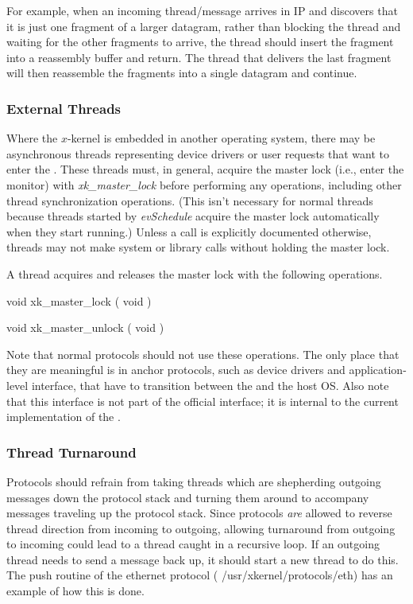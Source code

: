 For example, when an incoming thread/message arrives in IP and
discovers that it is just one fragment of a larger datagram, rather
than blocking the thread and waiting for the other fragments to arrive,
the thread should insert the fragment into a reassembly buffer and
return. The thread that delivers the last fragment will then
reassemble the fragments into a single datagram and continue.

\subsubsection{External Threads}
\label{ext-threads}

Where the $x$-kernel is embedded in another operating system, there
may be asynchronous threads representing device drivers or user
requests that want to enter the \xk{}.  These threads must, in
general, acquire the \xk{} master lock (i.e., enter the \xk{} monitor)
with {\em xk\_master\_lock} before performing any \xk{} operations,
including other thread synchronization operations.  (This isn't
necessary for normal \xk{} threads because threads started by {\em
evSchedule} acquire the master lock automatically when they start
running.)  Unless a call is explicitly documented otherwise, threads
may not make \xk{} system or library calls without holding the master
lock.

A thread acquires and releases the master \xk{} lock with the following
operations.
\medskip

{\sem void} {\bold xk\_master\_lock} ( {\sem void} )

\medskip

{\sem void} {\bold xk\_master\_unlock} ( {\sem void} )

\bigskip

Note that normal protocols should not use these operations. The only
place that they are meaningful is in anchor protocols, such as device
drivers and application-level interface, that have to transition
between the \xk{} and the host OS. Also note that this interface is
not part of the official \xk{} interface; it is internal to the
current implementation of the \xk{}.

\subsubsection{Thread Turnaround}

Protocols should refrain from taking threads which are shepherding
outgoing messages down the protocol stack and turning them around to
accompany messages traveling up the protocol stack.  Since protocols
{\em are} allowed to reverse thread direction from incoming to
outgoing, allowing turnaround from outgoing to incoming could lead to
a thread caught in a recursive loop.  If an outgoing thread needs to
send a message back up, it should start a new thread to do this.  The
push routine of the ethernet protocol ({\sanss
/usr/xkernel/protocols/eth}) has an example of how this is done.

